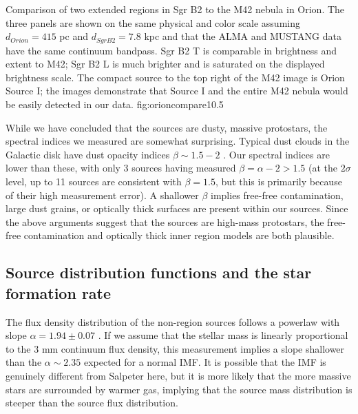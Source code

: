 \documentclass[twocolumn]{aastex61}
\begin{document}
{Comparison of two extended \hii regions in Sgr B2 to the M42 nebula in Orion.
The three panels are shown on the same physical and color scale assuming
$d_{Orion} = 415$ pc and $d_{Sgr B2} = 7.8$ kpc and that the ALMA and MUSTANG
data have the same continuum bandpass.  Sgr B2 \hii T is comparable in
brightness and extent to M42; Sgr B2 \hii L is much brighter and is saturated
on the displayed brightness scale.  The compact source to the top right of the
M42 image is Orion Source I; the images demonstrate that Source I and the entire
M42 nebula would be easily detected in our data.
}
{fig:orioncompare}{1}{0.5\textwidth}

While we have concluded that the sources are dusty, massive protostars, the
spectral indices we measured are somewhat surprising.  Typical dust clouds in
the Galactic disk have dust opacity indices $\beta\sim1.5-2$
\citep{Schnee2010a,Shirley2011a,Sadavoy2016a}.  Our spectral indices are lower
than these, with only 3 sources having measured $\beta=\alpha-2 > 1.5$ (at the
$2\sigma$ level, up to 11 sources are consistent with $\beta=1.5$, but this is
primarily because of their high measurement error).  A shallower $\beta$
implies free-free contamination, large dust grains, or optically thick surfaces
are present within our sources.  Since the above arguments suggest that the
sources are high-mass protostars, the free-free contamination and optically
thick inner region models are both plausible.

\subsection{Source distribution functions and the star formation rate}

The flux density distribution of the non-\hii region sources follows a powerlaw
with slope $\alpha=1.94\pm0.07$ \citep[fitted with the MLE method
of][]{Clauset2007a}.  If we assume that the stellar mass is linearly
proportional to the 3 mm continuum flux density, this measurement implies a
slope shallower than the $\alpha\sim2.35$ expected for a normal IMF.  It is
possible that the IMF is genuinely different from Salpeter here, but it is more
likely that the more massive stars are surrounded by warmer gas, implying that
the source mass distribution is steeper than the source flux distribution.
\end{document}
